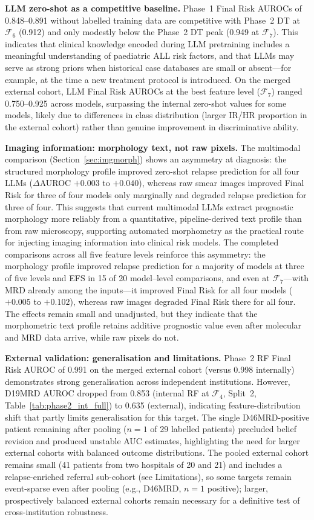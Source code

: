 \documentclass[pdflatex,sn-nature]{sn-jnl}
\begin{document}
\textbf{LLM zero-shot as a competitive baseline.}
Phase~1 Final Risk AUROCs of 0.848--0.891 without labelled training
data are competitive with Phase~2 DT at $\mathcal{F}_6$ (0.912) and
only modestly below the Phase~2 DT peak (0.949 at $\mathcal{F}_7$).
This indicates that clinical knowledge encoded during LLM pretraining
includes a meaningful understanding of paediatric ALL risk factors, and
that LLMs may serve as strong priors when historical case databases are
small or absent—for example, at the time a new treatment protocol is
introduced.
On the merged external cohort, LLM Final Risk AUROCs at the best
feature level ($\mathcal{F}_7$) ranged 0.750--0.925 across models,
surpassing the internal zero-shot values for some models, likely due
to differences in class distribution (larger IR/HR proportion in the
external cohort) rather than genuine improvement in discriminative
ability.

\textbf{Imaging information: morphology text, not raw pixels.}
The multimodal comparison (Section~\ref{sec:imgmorph}) shows an
asymmetry at diagnosis: the structured morphology profile improved
zero-shot relapse prediction for all four LLMs ($\Delta$AUROC
$+0.003$ to $+0.040$), whereas raw smear images improved Final Risk
for three of four models only marginally and degraded relapse
prediction for three of four.
This suggests that current multimodal LLMs extract prognostic
morphology more reliably from a quantitative, pipeline-derived text
profile than from raw microscopy, supporting automated morphometry as
the practical route for injecting imaging information into clinical
risk models.
The completed comparisons across all five feature levels reinforce
this asymmetry: the morphology profile improved relapse prediction for
a majority of models at three of five levels and EFS in 15 of 20
model--level comparisons, and even at $\mathcal{F}_7$—with MRD already
among the inputs—it improved Final Risk for all four models ($+0.005$
to $+0.102$), whereas raw images degraded Final Risk there for all
four.
The effects remain small and unadjusted, but they indicate that the
morphometric text profile retains additive prognostic value even after
molecular and MRD data arrive, while raw pixels do not.

\textbf{External validation: generalisation and limitations.}
Phase~2 RF Final Risk AUROC of 0.991 on the merged external cohort
(versus 0.998 internally) demonstrates strong generalisation across
independent institutions.
However, D19MRD AUROC dropped from 0.853 (internal RF at
$\mathcal{F}_4$, Split~2, Table~\ref{tab:phase2_int_full}) to 0.635
(external), indicating feature-distribution shift that partly limits
generalisation for this target.
The single D46MRD-positive patient remaining after pooling ($n=1$ of
29 labelled patients) precluded belief revision and produced unstable
AUC estimates, highlighting the need for larger external cohorts with
balanced outcome distributions.
The pooled external cohort remains small (41 patients from two
hospitals of 20 and 21) and includes a relapse-enriched referral
sub-cohort (see Limitations), so some targets remain
event-sparse even after pooling (e.g., D46MRD, $n=1$ positive);
larger, prospectively balanced external cohorts remain necessary for
a definitive test of cross-institution robustness.
\end{document}
